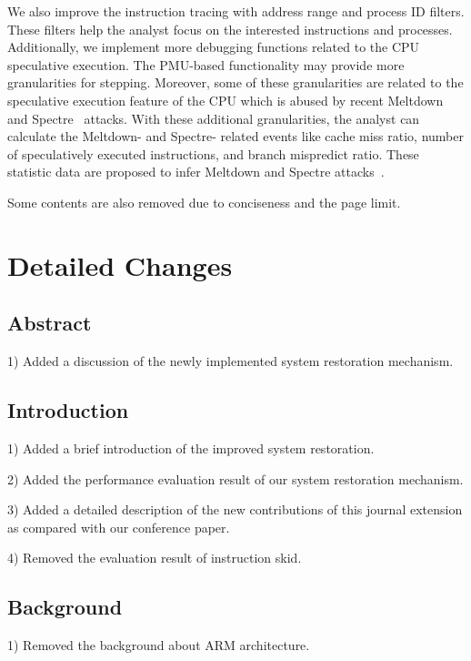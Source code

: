 \documentclass[journal,12pt,onecolumn,draftclsnofoot,]{IEEEtran}
\newcommand{\TheName}{\textsc{Ninja}}
\begin{document}
We also
improve the instruction tracing with address range and process ID filters.
These filters help the analyst focus on the interested instructions and processes.
Additionally, we implement more debugging functions related to the CPU 
speculative execution. The PMU-based functionality may provide more granularities 
for stepping. Moreover, some of these granularities are related to the 
speculative execution feature of the CPU which is abused by recent 
Meltdown~\cite{meltdown:lipp} and Spectre~\cite{spectre:kocher} attacks.
With these additional granularities, the analyst can calculate the Meltdown-
and Spectre- related events like cache miss ratio, number of speculatively
executed instructions, and branch mispredict ratio. These statistic data
are proposed to infer Meltdown and Spectre 
attacks~\cite{detection:israel, detection:capsule8}.

\iffalse
Our case study with the Meltdown attack on the ARM 
platform~\cite{meltdownpoc:cosmin} shows that \TheName{} is capable of detecting 
this new attack. 
\fi

Some contents are also removed due to conciseness and the page limit. 


\section{Detailed Changes}

\subsection{Abstract}
1) Added a discussion of the newly implemented system restoration mechanism.

\subsection{Introduction}
1) Added a brief introduction of the improved system restoration.

2) Added the performance evaluation result of our system restoration mechanism.

3) Added a detailed description of the new contributions of this journal extension 
as compared with our conference paper.

4) Removed the evaluation result of instruction skid.

\subsection{Background}
1) Removed the background about ARM architecture.
\end{document}
